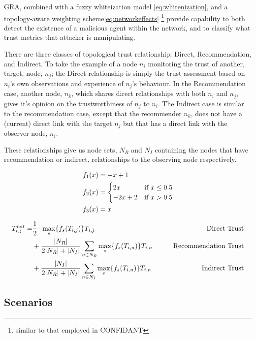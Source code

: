 \documentclass[runningheads,a4paper]{llncs}
\begin{document}
GRA, combined with a fuzzy whiteization model \eqref{eq:whitenization}, and a topology-aware weighting scheme\eqref{eq:networkeffects} \footnote{similar to that employed in CONFIDANT} provide capability to both detect the existence of a malicious agent within the network, and to classify what trust metrics that attacker is manipulating.

There are three classes of topological trust relationship; Direct, Recommendation, and Indirect.
To take the example of a node $n_i$ monitoring the trust of another, target, node, $n_j$; the Direct relationship is simply the trust assessment based on $n_i$'s own observations and experience of $n_j$'s behaviour.
In the Recommendation case, another node, $n_k$, which shares direct relationships with both $n_i$ and $n_j$, gives it's opinion on the trustworthiness of $n_j$ to $n_i$.
The Indirect case is similar to the recommendation case, except that the recommender $n_k$, does not have a (current) direct link with the target $n_j$ but that has a direct link with the observer node, $n_i$.

These relationships give us node sets, $N_R$ and $N_I$ containing the nodes that have recommendation or indirect, relationships to the observing node respectively.

\begin{align}
  \label{eq:whitenization}
  f_1(x) &= -x+1\notag\\
  f_2(x) &= 
  \begin{cases}
    2x & \text{if }x\leq 0.5\\
    -2x+2 & \text{if }x>0.5
  \end{cases}\\
  f_3(x) &= x\notag
\end{align}

\begin{align}
  \label{eq:networkeffects}
  T_{i,j}^{net}=&\frac{1}{2} \cdot \max_s\{f_s(T_{i,j})\} T_{i,j}&\qquad \text{Direct Trust}\notag \\
  &+ \frac{|N_R| }{2|N_R| + |N_I|}\sum_{n \in N_R} \max_s\{f_s(T_{i,n})\} T_{i,n}&\qquad \text{Recommendation Trust}\notag\\
  &+ \frac{|N_I| }{2|N_R| + |N_I|}\sum_{n \in N_I} \max_s\{f_s(T_{i,n})\} T_{i,n} &\qquad \text{Indirect Trust}
\end{align}

\subsection{Scenarios}
\end{document}
